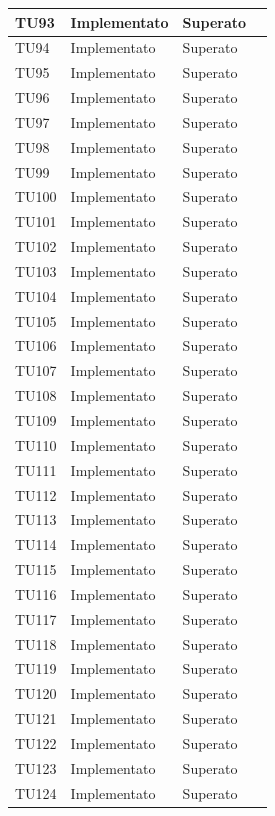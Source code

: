 \begin{longtable}{|>{\centering\arraybackslash}m{1.6cm}|>{\centering\arraybackslash}m{6.41cm}|>{\centering\arraybackslash}m{3.1cm}| c |}
	TU93 & Implementato & Superato  \\ \hline
	TU94 & Implementato & Superato  \\ \hline
	TU95 & Implementato & Superato  \\ \hline
	TU96 & Implementato & Superato  \\ \hline
	TU97 & Implementato & Superato  \\ \hline
	TU98 & Implementato & Superato  \\ \hline
	TU99 & Implementato & Superato  \\ \hline
	TU100 & Implementato & Superato  \\ \hline
	TU101 & Implementato & Superato  \\ \hline
	TU102 & Implementato & Superato  \\ \hline
	TU103 & Implementato & Superato  \\ \hline
	TU104 & Implementato & Superato  \\ \hline
	TU105 & Implementato & Superato  \\ \hline
	TU106 & Implementato & Superato  \\ \hline
	TU107 & Implementato & Superato  \\ \hline
	TU108 & Implementato & Superato  \\ \hline
	TU109 & Implementato & Superato  \\ \hline
	TU110 & Implementato & Superato  \\ \hline
	TU111 & Implementato & Superato  \\ \hline
	TU112 & Implementato & Superato  \\ \hline
	TU113 & Implementato & Superato  \\ \hline
	TU114 & Implementato & Superato  \\ \hline
	TU115 & Implementato & Superato  \\ \hline
	TU116 & Implementato & Superato  \\ \hline
	TU117 & Implementato & Superato  \\ \hline
	TU118 & Implementato & Superato  \\ \hline
	TU119 & Implementato & Superato  \\ \hline
	TU120 & Implementato & Superato  \\ \hline
	TU121 & Implementato & Superato  \\ \hline
	TU122 & Implementato & Superato  \\ \hline
	TU123 & Implementato & Superato  \\ \hline
	TU124 & Implementato & Superato  \\ \hline

\end{longtable}
